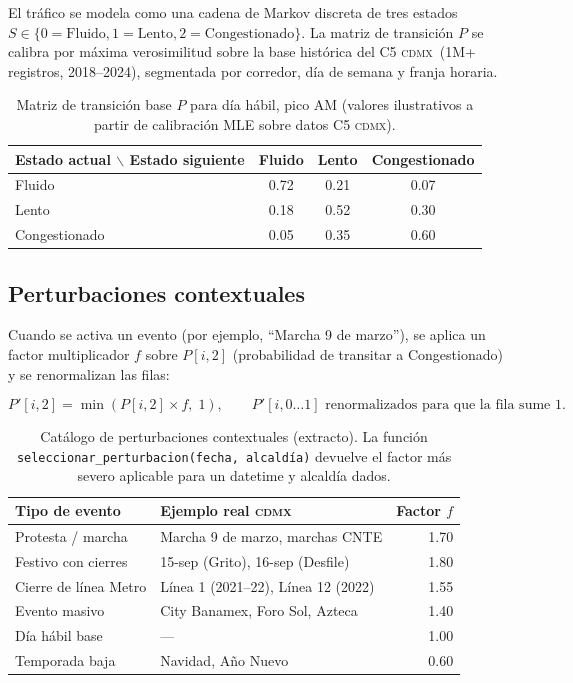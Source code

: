 \documentclass[11pt,a4paper]{article}
\newcommand{\CDMX}{\textsc{cdmx}}
\begin{document}
El tráfico se modela como una cadena de Markov discreta de tres
estados $S \in \{0 = \text{Fluido}, 1 = \text{Lento}, 2 = \text{Congestionado}\}$.
La matriz de transición $P$ se calibra por máxima verosimilitud
sobre la base histórica del C5 \CDMX\ (\num{1}M+ registros,
2018--2024), segmentada por corredor, día de semana y franja horaria.

\begin{table}[H]
\centering
\small
\renewcommand{\arraystretch}{1.4}
\begin{tabular}{@{}l c c c@{}}
\toprule
\rowcolor{vialNavy!10}
\textbf{Estado actual} $\backslash$ \textbf{Estado siguiente}
  & \textbf{Fluido} & \textbf{Lento} & \textbf{Congestionado} \\
\midrule
Fluido       & 0.72 & 0.21 & 0.07 \\
Lento        & 0.18 & 0.52 & 0.30 \\
Congestionado & 0.05 & 0.35 & 0.60 \\
\bottomrule
\end{tabular}
\caption{Matriz de transición base $P$ para día hábil, pico AM (valores ilustrativos
         a partir de calibración MLE sobre datos C5 \CDMX).}
\label{tab:markov}
\end{table}

\subsection{Perturbaciones contextuales}

Cuando se activa un evento (por ejemplo, ``Marcha 9 de marzo''),
se aplica un factor multiplicador $f$ sobre $P[i, 2]$ (probabilidad
de transitar a Congestionado) y se renormalizan las filas:

\[
P'[i, 2] = \min(P[i, 2] \times f,\; 1), \qquad
P'[i, 0\ldots1] \text{ renormalizados para que la fila sume } 1.
\]

\begin{table}[H]
\centering
\small
\renewcommand{\arraystretch}{1.4}
\begin{tabular}{@{}l l r@{}}
\toprule
\rowcolor{vialNavy!10}
\textbf{Tipo de evento} & \textbf{Ejemplo real \CDMX} & \textbf{Factor $f$} \\
\midrule
Protesta / marcha     & Marcha 9 de marzo, marchas CNTE & 1.70 \\
Festivo con cierres   & 15-sep (Grito), 16-sep (Desfile) & 1.80 \\
Cierre de línea Metro & Línea 1 (2021--22), Línea 12 (2022) & 1.55 \\
Evento masivo         & City Banamex, Foro Sol, Azteca & 1.40 \\
Día hábil base        & --- & 1.00 \\
Temporada baja        & Navidad, Año Nuevo & 0.60 \\
\bottomrule
\end{tabular}
\caption{Catálogo de perturbaciones contextuales (extracto). La función
         \texttt{seleccionar\_perturbacion(fecha, alcaldía)} devuelve
         el factor más severo aplicable para un datetime y alcaldía dados.}
\label{tab:perturbaciones}
\end{table}
\end{document}
